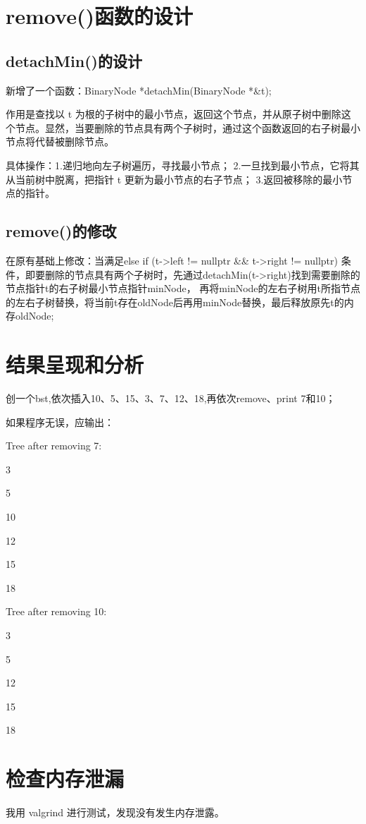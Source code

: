 \documentclass[UTF8]{ctexart}
\begin{document}
\pagestyle{fancy}
\fancyhead{}

\section{remove()函数的设计}

\subsection{detachMin()的设计}
新增了一个函数：BinaryNode *detachMin(BinaryNode *\&t);

作用是查找以 t 为根的子树中的最小节点，返回这个节点，并从原子树中删除这个节点。显然，当要删除的节点具有两个子树时，通过这个函数返回的右子树最小节点将代替被删除节点。


具体操作：1.递归地向左子树遍历，寻找最小节点；
2.一旦找到最小节点，它将其从当前树中脱离，把指针 t 更新为最小节点的右子节点；
3.返回被移除的最小节点的指针。


\subsection{remove()的修改}
在原有基础上修改：当满足else if (t->left != nullptr \&\& t->right != nullptr) 条件，即要删除的节点具有两个子树时，先通过detachMin(t->right)找到需要删除的节点指针t的右子树最小节点指针minNode，
再将minNode的左右子树用t所指节点的左右子树替换，将当前t存在oldNode后再用minNode替换，最后释放原先t的内存oldNode;

\section{结果呈现和分析}
创一个bst,依次插入10、5、15、3、7、12、18,再依次remove、print 7和10；

如果程序无误，应输出：

Tree after removing 7:

3

5

10

12

15

18

Tree after removing 10:

3

5

12

15

18

\section{检查内存泄漏}

我用 valgrind 进行测试，发现没有发生内存泄露。
\end{document}
